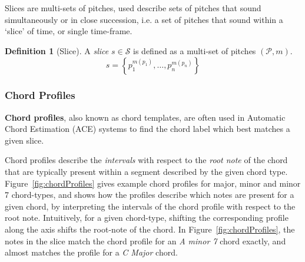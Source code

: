 \documentclass[12pt,a4paper,twoside,openany]{report} \usepackage[pdfborder={0 0 0}]{hyperref}    %
\theoremstyle{definition} \newtheorem{definition}{Definition}[section]
\begin{document}
Slices are multi-sets of pitches, used describe sets of pitches that sound simultaneously or in close succession, i.e. a set of pitches that sound within a `slice' of time, or single time-frame. 

\begin{definition}[Slice] 
  A \textit{slice} $s \in \mathcal{S}$ is defined as a multi-set of pitches $(\mathcal{P}, m)$. 
  \begin{equation} s = \left\{ p_1^{m(p_1)} , \dots, p_n^{m(p_n)} \right\}
  \label{eq:sliceDef} \end{equation}
\end{definition}




\subsubsection{Chord Profiles}
\label{sub:chordProfiles}

\textbf{Chord profiles}, also known as chord templates, are often used in Automatic Chord Estimation (ACE) systems to
find the chord label which best matches a given slice. 

Chord profiles describe the \textit{intervals} with respect to the \textit{root note} of the chord that
are typically present within a segment described by the given chord type. Figure~\ref{fig:chordProfiles} gives
example chord profiles for major, minor and minor 7 chord-types, and shows how the profiles describe which notes are present for
a given chord, by interpreting the intervals of the chord profile with respect to the root note. Intuitively, for
a given chord-type, shifting the corresponding profile along the axis shifts the root-note of the chord. In
Figure~\ref{fig:chordProfiles}, the notes in the slice match the chord profile for an \textit{A minor 7} chord exactly,
and almost matches the profile for a \textit{C Major} chord.
\end{document}
